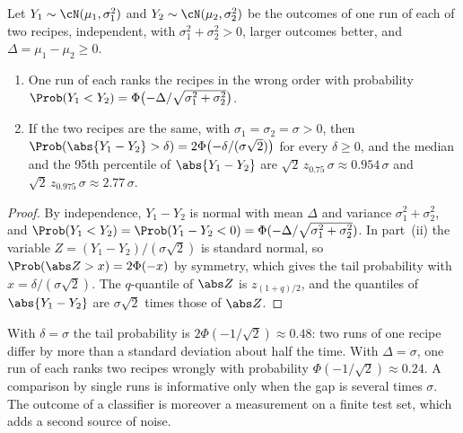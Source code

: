 \begin{refsection}
\begin{proposition}\label{prop:seeds:tworuns}
Let $Y_1\sim\cN(\mu_1,\sigma_1^2)$ and $Y_2\sim\cN(\mu_2,\sigma_2^2)$ be the outcomes of one run of each of two recipes, independent, with $\sigma_1^2+\sigma_2^2>0$, larger outcomes better, and $\Delta=\mu_1-\mu_2\ge0$.
\begin{enumerate}
\item One run of each ranks the recipes in the wrong order with probability $\Prob(Y_1<Y_2)=\Phi\bigl(-\Delta/\sqrt{\sigma_1^2+\sigma_2^2}\bigr)$.
\item If the two recipes are the same, with $\sigma_1=\sigma_2=\sigma>0$, then $\Prob(\abs{Y_1-Y_2}>\delta)=2\Phi\bigl(-\delta/(\sigma\sqrt2)\bigr)$ for every $\delta\ge0$, and the median and the 95th percentile of $\abs{Y_1-Y_2}$ are $\sqrt2\,z_{0.75}\,\sigma\approx0.954\,\sigma$ and $\sqrt2\,z_{0.975}\,\sigma\approx2.77\,\sigma$.
\end{enumerate}
\end{proposition}

\begin{proof}
By independence, $Y_1-Y_2$ is normal with mean $\Delta$ and variance $\sigma_1^2+\sigma_2^2$, and $\Prob(Y_1<Y_2)=\Prob(Y_1-Y_2<0)=\Phi(-\Delta/\sqrt{\sigma_1^2+\sigma_2^2})$. In part~(ii) the variable $Z=(Y_1-Y_2)/(\sigma\sqrt2)$ is standard normal, so $\Prob(\abs Z>x)=2\Phi(-x)$ by symmetry, which gives the tail probability with $x=\delta/(\sigma\sqrt2)$. The $q$-quantile of $\abs Z$ is $z_{(1+q)/2}$, and the quantiles of $\abs{Y_1-Y_2}$ are $\sigma\sqrt2$ times those of $\abs Z$.
\end{proof}

With $\delta=\sigma$ the tail probability is $2\Phi(-1/\sqrt2)\approx0.48$: two runs of one recipe differ by more than a standard deviation about half the time. With $\Delta=\sigma$, one run of each ranks two recipes wrongly with probability $\Phi(-1/\sqrt2)\approx0.24$. A comparison by single runs is informative only when the gap is several times $\sigma$. The outcome of a classifier is moreover a measurement on a finite test set, which adds a second source of noise.


\end{refsection}
